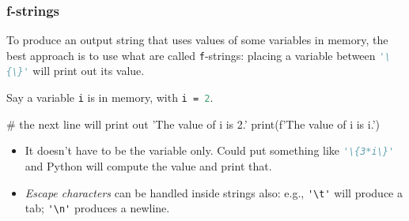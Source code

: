 \documentclass{beamer}
\newenvironment{codeblock}
    {\hfill\begin{beamerboxesrounded}[lower=codecol, width=0.8\textwidth]
    \medskip

    }
    { 
    \end{beamerboxesrounded}\hfill
    }
\theoremstyle{example}
\newcommand{\ct}[1]{\lstinline[language=Python]!#1!}
\newcommand{\st}[1]{\lstinline[language=Python,basicstyle=\ttfamily,stringstyle=\small\color{strings}]!#1!}
\newcommand{\ttt}[1]{{\small\texttt{#1}}}
\newcommand{\comment}[1]{}
\begin{document}
\begin{frame}[fragile]
\frametitle{{\ttm f}-strings}

To produce an output string that uses values of some variables in memory, the best approach is to use what are called \ttt{f}-strings: placing a variable between \st{'\{\}'} will print out its value.

Say a variable \ttt{i} is in memory, with \ttt{i = }\ct{2}.

\begin{codeblock}

\begin{python}
# the next line will print out 'The value of i is 2.'
print(f'The value of i is {i}.')
\end{python}

\end{codeblock}

\begin{itemize}
	\item It doesn't have to be the variable only. Could put something like \st{'\{3*i\}'} and Python will compute the value and print that.
	\item \emph{Escape characters} can be handled inside strings also: e.g., \verb|'\t'| will produce a tab; \verb|'\n'| produces a newline.
\end{itemize}

\end{frame}

\comment{
\begin{frame}[fragile]
\frametitle{Two more container types}

Two important types that contain items, but are not sequential are sets ({\ttb set} type) and dictionaries ({\ttb dict} type).

\begin{itemize}
	\item {\ttb set}: roughly matches the mathematical notion of a set. Items are not ordered; there are no repeated items.
	\item {\ttb dict}: has \emph{dictionary keys}; for each key there is an item (the ``entry'' for that key).
	\item Two example dictionaries with same keys:
\end{itemize}

\begin{codeblock}

\begin{python}
my_pet = {'name':'Spot', 'age':4, 'type':'dog'}
neighbor_pet = {'name':'Checkers', 'age':2, 'type':'dog'}
\end{python}

\end{codeblock}

\vspace*{12pt}
Good idea to work with dictionaries for certain kinds of data. Later in the semester, will work with something very similar to a dictionary {--} a DataFrame.
\end{frame}
}
\end{document}
